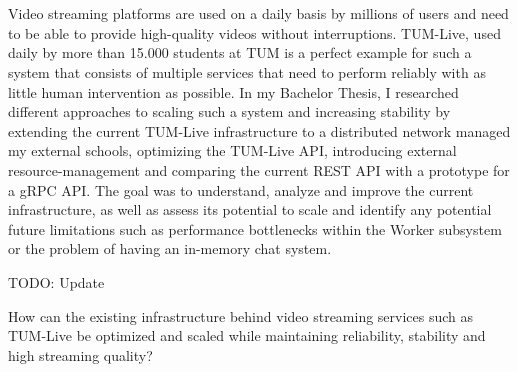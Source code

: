 \chapter{\abstractname}

Video streaming platforms are used on a daily basis by millions of users and need to be able to provide high-quality videos without interruptions. TUM-Live, used daily by more than 15.000 students at TUM is a perfect example for such a system that consists of multiple services that need to perform reliably with as little human intervention as possible.
In my Bachelor Thesis, I researched different approaches to scaling such a system and increasing stability by extending the current TUM-Live infrastructure to a distributed network managed my external schools, optimizing the TUM-Live API, introducing external resource-management and comparing the current REST API with a prototype for a gRPC API. The goal was to understand, analyze and improve the current infrastructure, as well as assess its potential to scale and identify any potential future limitations such as performance bottlenecks within the Worker subsystem or the problem of having an in-memory chat system.

TODO: Update

How can the existing infrastructure behind video streaming services such as TUM-Live be optimized and scaled while maintaining reliability, stability and high streaming quality?
